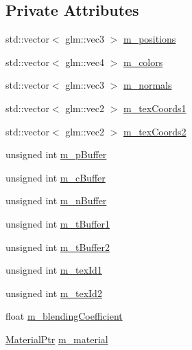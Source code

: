 \subsection*{Private Attributes}
\begin{DoxyCompactItemize}
\item 
std\+::vector$<$ glm\+::vec3 $>$ \hyperlink{classMultiTexturedCubeRenderable_a60daa9382a5a20272fe5aff5f06c7fac}{m\+\_\+positions}
\item 
std\+::vector$<$ glm\+::vec4 $>$ \hyperlink{classMultiTexturedCubeRenderable_a6b898288adb8ab29e4faf8557094d81d}{m\+\_\+colors}
\item 
std\+::vector$<$ glm\+::vec3 $>$ \hyperlink{classMultiTexturedCubeRenderable_a240496a75e60b0ed5af4dfafad198fa7}{m\+\_\+normals}
\item 
std\+::vector$<$ glm\+::vec2 $>$ \hyperlink{classMultiTexturedCubeRenderable_a527036e4aa13864829e20a897a16f8cf}{m\+\_\+tex\+Coords1}
\item 
std\+::vector$<$ glm\+::vec2 $>$ \hyperlink{classMultiTexturedCubeRenderable_adcab47d5610c8f989658103a3cd2e8c8}{m\+\_\+tex\+Coords2}
\item 
unsigned int \hyperlink{classMultiTexturedCubeRenderable_aa9e62d83d66f405662bf3e92be2564ea}{m\+\_\+p\+Buffer}
\item 
unsigned int \hyperlink{classMultiTexturedCubeRenderable_af11d0075bbe8aa521fae8fb437ff98af}{m\+\_\+c\+Buffer}
\item 
unsigned int \hyperlink{classMultiTexturedCubeRenderable_a49898f71f097b8e6ffe3383a019f3d5c}{m\+\_\+n\+Buffer}
\item 
unsigned int \hyperlink{classMultiTexturedCubeRenderable_a789fa5e3d95bb43f2fe209ddf0a68884}{m\+\_\+t\+Buffer1}
\item 
unsigned int \hyperlink{classMultiTexturedCubeRenderable_ae541f09397856a5bde7c1db6962ebe54}{m\+\_\+t\+Buffer2}
\item 
unsigned int \hyperlink{classMultiTexturedCubeRenderable_ac00c241a06009cd3650bc09658209394}{m\+\_\+tex\+Id1}
\item 
unsigned int \hyperlink{classMultiTexturedCubeRenderable_a84eb4a8f43e2eed94101b563c61aae0c}{m\+\_\+tex\+Id2}
\item 
float \hyperlink{classMultiTexturedCubeRenderable_a91914ee0e86d087d1778d1ecd461256f}{m\+\_\+blending\+Coefficient}
\item 
\hyperlink{Material_8hpp_a1d47cd05ca683e287435cf0b363fbfe1}{Material\+Ptr} \hyperlink{classMultiTexturedCubeRenderable_a7fa7b1dce63798c5f3a319e6fb6f2859}{m\+\_\+material}
\end{DoxyCompactItemize}
